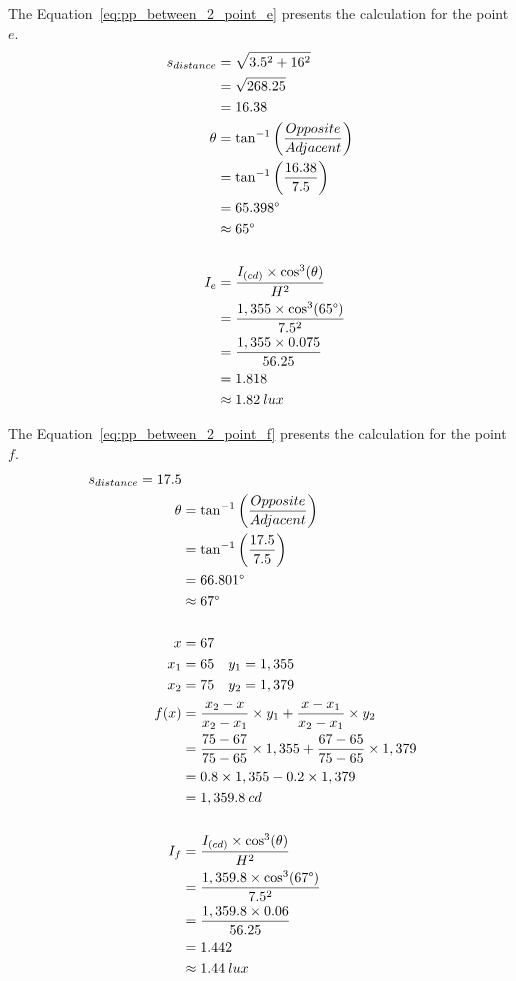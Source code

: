 The Equation~\ref{eq:pp_between_2_point_e} presents the calculation for the point $e$.
\begin{equation}
\begin{split}
s_{distance} & = \sqrt{3.5^2 + 16^2} \\
 & = \sqrt{268.25} \\
 & = 16.38 \\
\theta &= \tan^{-1}\left( \frac{Opposite}{Adjacent} \right) \\
 & = \tan^{-1}\left( \frac{16.38}{7.5} \right) \\
 & = 65.398\degree \\
 & \approx 65\degree\\
\\
I_e &= \frac{I_{(cd)} \times \cos^3(\theta)}{H^2} \\
 &= \frac{1,355 \times \cos^3(65\degree)}{7.5^2} \\
 &= \frac{1,355 \times 0.075}{56.25} \\
 & = 1.818 \\
 & \approx 1.82\: lux
\end{split}
\label{eq:pp_between_2_point_e}
\end{equation}

The Equation~\ref{eq:pp_between_2_point_f} presents the calculation for the point $f$.
\begin{equation}
\begin{split}
s_{distance} = 17.5\\
\theta &= \tan^{-1}\left( \frac{Opposite}{Adjacent} \right) \\
 & = \tan^{-1}\left( \frac{17.5}{7.5} \right) \\
 & = 66.801\degree \\
 & \approx 67\degree\\
\\
x & = 67 \\
x_1 & = 65 \quad y_1 = 1,355 \\
x_2 & = 75 \quad y_2 = 1,379 \\
f(x) &= \frac{x_2 - x}{x_2 - x_1} \times y_1 +
       \frac{x - x_1}{x_2 - x_1} \times y_2 \\
 &= \frac{75 - 67}{75 - 65} \times 1,355 +
    \frac{67 - 65}{75 - 65} \times 1,379 \\
 & = 0.8 \times 1,355 - 0.2 \times 1,379 \\
 & = 1,359.8\: cd \\
\\
I_f &= \frac{I_{(cd)} \times \cos^3(\theta)}{H^2} \\
 &= \frac{1,359.8 \times \cos^3(67\degree)}{7.5^2} \\
 &= \frac{1,359.8 \times 0.06}{56.25} \\
 & = 1.442 \\
 & \approx 1.44\: lux
\end{split}
\label{eq:pp_between_2_point_f}
\end{equation}

